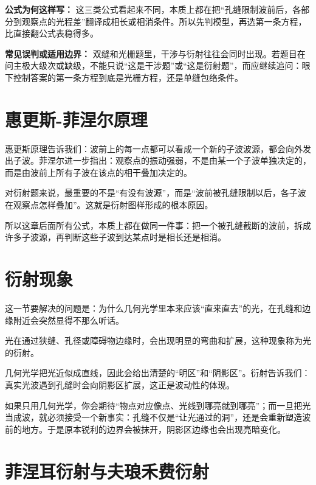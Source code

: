 \documentclass[lang=cn,11pt]{elegantbook}
\begin{document}
\textbf{公式为何这样写：} 这三类公式看起来不同，本质上都在把“孔缝限制波前后，各部分到观察点的光程差”翻译成相长或相消条件。所以先判模型，再选第一条方程，比直接翻公式表稳得多。

\textbf{常见误判或适用边界：} 双缝和光栅题里，干涉与衍射往往会同时出现。若题目在问主极大级次或缺级，不能只说“这是干涉题”或“这是衍射题”，而应继续追问：眼下控制答案的第一条方程到底是光栅方程，还是单缝包络条件。

\section{惠更斯-菲涅尔原理}

惠更斯原理告诉我们：波前上的每一点都可以看成一个新的子波波源，都会向外发出子波。菲涅尔进一步指出：观察点的振动强弱，不是由某一个子波单独决定的，而是由波前上所有子波在该点的相干叠加决定的。

\begin{note}
对衍射题来说，最重要的不是“有没有波源”，而是“波前被孔缝限制以后，各子波在观察点怎样叠加”。这就是衍射图样形成的根本原因。
\end{note}

\begin{bridge}
所以这章后面所有公式，本质上都在做同一件事：把一个被孔缝截断的波前，拆成许多子波源，再判断这些子波到达某点时是相长还是相消。
\end{bridge}

\section{衍射现象}

这一节要解决的问题是：为什么几何光学里本来应该“直来直去”的光，在孔缝和边缘附近会突然显得不那么听话。

光在通过狭缝、孔径或障碍物边缘时，会出现明显的弯曲和扩展，这种现象称为光的衍射。

\begin{note}
几何光学把光近似成直线，因此会给出清楚的“明区”和“阴影区”。衍射告诉我们：真实光波遇到孔缝时会向阴影区扩展，这正是波动性的体现。
\end{note}

如果只用几何光学，你会期待“物点对应像点、光线到哪亮就到哪亮”；而一旦把光当成波，就必须接受一个新事实：孔缝不仅是“让光通过的洞”，还是会重新塑造波前的地方。于是原本锐利的边界会被抹开，阴影区边缘也会出现亮暗变化。

\section{菲涅耳衍射与夫琅禾费衍射}
\end{document}
